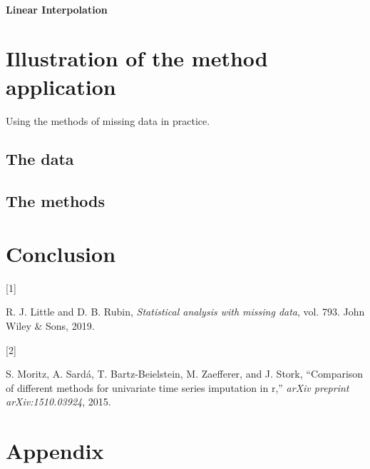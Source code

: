 \documentclass[
]{report}
\newlength{\cslhangindent}
\newlength{\csllabelwidth}
\newenvironment{CSLReferences}[2] %
 {\begin{list}{}{%
  \setlength{\itemindent}{0pt}
  \setlength{\leftmargin}{0pt}
  \setlength{\parsep}{0pt}
  \ifodd #1
   \setlength{\leftmargin}{\cslhangindent}
   \setlength{\itemindent}{-1\cslhangindent}
  \fi
  \setlength{\itemsep}{#2\baselineskip}}}
 {\end{list}}
\newcommand{\CSLLeftMargin}[1]{\parbox[t]{\csllabelwidth}{\strut#1\strut}}
\newcommand{\CSLRightInline}[1]{\parbox[t]{\linewidth - \csllabelwidth}{\strut#1\strut}}
\begin{document}
\subsubsection{Linear Interpolation}\label{linear-interpolation}

\chapter{Illustration of the method
application}\label{illustration-of-the-method-application}

Using the methods of missing data in practice.

\section{The data}\label{the-data}

\section{The methods}\label{the-methods}

\chapter{Conclusion}\label{conclusion}

\label{refs}
\begin{CSLReferences}{0}{0}
\CSLLeftMargin{{[}1{]} }%
\CSLRightInline{R. J. Little and D. B. Rubin, \emph{Statistical analysis
with missing data}, vol. 793. John Wiley \& Sons, 2019.}

\CSLLeftMargin{{[}2{]} }%
\CSLRightInline{S. Moritz, A. Sardá, T. Bartz-Beielstein, M. Zaefferer,
and J. Stork, {``Comparison of different methods for univariate time
series imputation in r,''} \emph{arXiv preprint arXiv:1510.03924},
2015.}

\end{CSLReferences}

\chapter{Appendix}\label{appendix}
\end{document}
